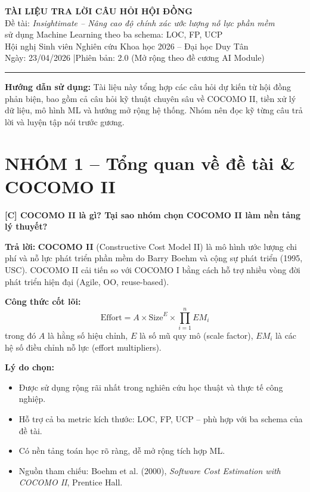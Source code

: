 \documentclass[12pt,a4paper]{article}
\newcommand{\Q}[2]{%
  \begin{questionbox}
    \textbf{\color{qcolor}[C\arabic{questioncounter}] #1}
  \end{questionbox}
  \begin{answerbox}
    \textbf{\color{acolor}Trả lời:} #2
  \end{answerbox}
  \stepcounter{questioncounter}
  \vspace{6pt}
}
\newcounter{questioncounter}
\begin{document}
\begin{center}
  {\LARGE\bfseries\color{headercolor} TÀI LIỆU TRA LỜI CÂU HỎI HỘI ĐỒNG}\\[4pt]
  {\large\color{qcolor} Đề tài: \textit{Insightimate -- Nâng cao độ chính xác ước lượng nỗ lực phần mềm}}\\[2pt]
  {\normalsize\color{qcolor} sử dụng Machine Learning theo ba schema: LOC, FP, UCP}\\[6pt]
  {\small Hội nghị Sinh viên Nghiên cứu Khoa học 2026 -- Đại học Duy Tân}\\[2pt]
  {\small\color{gray} Ngày: 23/04/2026 \quad|\quad Phiên bản: 2.0 (Mở rộng theo đề cương AI Module)}
\end{center}

\vspace{2pt}
\hrule
\vspace{8pt}

\begin{notebox}
  \textbf{\color{notecolor}Hướng dẫn sử dụng:} Tài liệu này tổng hợp các câu hỏi dự kiến từ hội đồng phản biện, bao gồm cả câu hỏi kỹ thuật chuyên sâu về COCOMO II, tiền xử lý dữ liệu, mô hình ML và hướng mở rộng hệ thống. Nhóm nên đọc kỹ từng câu trả lời và luyện tập nói trước gương.
\end{notebox}

\vspace{6pt}

\section{NHÓM 1 -- Tổng quan về đề tài \& COCOMO II}

\Q{COCOMO II là gì? Tại sao nhóm chọn COCOMO II làm nền tảng lý thuyết?}{%
  \textbf{COCOMO II} (Constructive Cost Model II) là mô hình ước lượng chi phí và nỗ lực phát triển phần mềm do Barry Boehm và cộng sự phát triển (1995, USC). COCOMO II cải tiến so với COCOMO I bằng cách hỗ trợ nhiều vòng đời phát triển hiện đại (Agile, OO, reuse-based).

  \textbf{Công thức cốt lõi:}
  \[
    \text{Effort} = A \times \text{Size}^{E} \times \prod_{i=1}^{n} EM_i
  \]
  trong đó $A$ là hằng số hiệu chỉnh, $E$ là số mũ quy mô (scale factor), $EM_i$ là các hệ số điều chỉnh nỗ lực (effort multipliers).

  \textbf{Lý do chọn:}
  \begin{itemize}[leftmargin=1.5em, topsep=2pt]
    \item Được sử dụng rộng rãi nhất trong nghiên cứu học thuật và thực tế công nghiệp.
    \item Hỗ trợ cả ba metric kích thước: LOC, FP, UCP -- phù hợp với ba schema của đề tài.
    \item Có nền tảng toán học rõ ràng, dễ mở rộng tích hợp ML.
    \item Nguồn tham chiếu: Boehm et al. (2000), \textit{Software Cost Estimation with COCOMO II}, Prentice Hall.
  \end{itemize}
}
\end{document}
